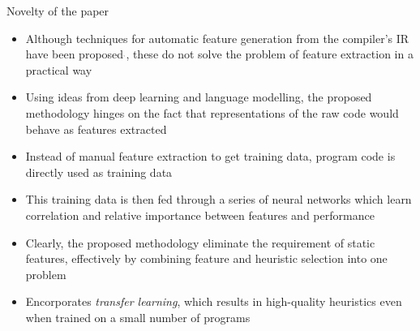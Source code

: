 \documentclass[10pt]{beamer}
\newcommand{\citecomma}{\({}^{{}_{,}}\)}
\begin{document}
\begin{frame}{Novelty of the paper}
\begin{itemize}
\item<1->{Although techniques for automatic feature generation from the compiler's IR have been proposed\citecomma{}, these do not solve the problem of feature extraction in a practical way}
\item<2->{Using ideas from deep learning and language modelling, the proposed methodology hinges on the fact that representations of the raw code would behave as features extracted}
\item<3->{Instead of manual feature extraction to get training data, program code is directly used as training data}
\item<4->{This training data is then fed through a series of neural networks which learn correlation and relative importance between features and performance}
\item<5->{Clearly, the proposed methodology eliminate the requirement of static features, effectively by combining feature and heuristic selection into one problem}
\item<6->{Encorporates \textit{transfer learning}, which results in high-quality heuristics even when trained on a small number of programs}
\end{itemize}
\end{frame}
\end{document}
